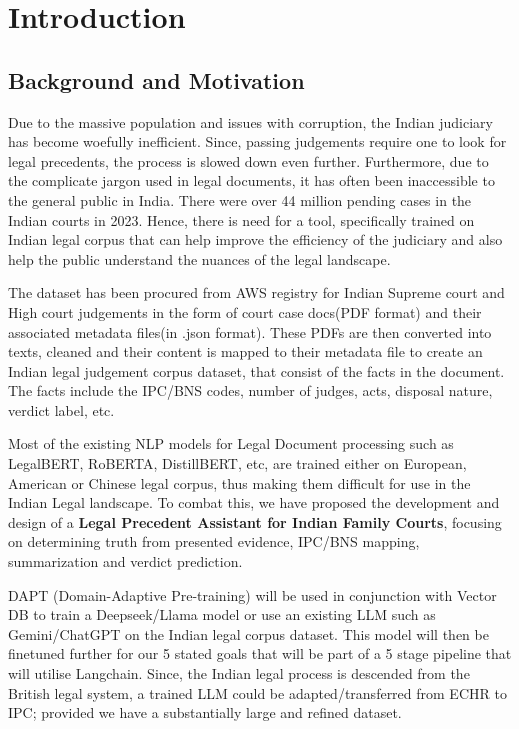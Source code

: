 \chapter{Introduction}{\label{ch:intro}}
\section{Background and Motivation}


Due to the massive population and issues with corruption, the Indian judiciary has become woefully inefficient. Since, passing judgements require one to look for legal precedents, the process is slowed down even further. Furthermore, due to the complicate jargon used in legal documents, it has often been inaccessible to the general public in India. There were over 44 million pending cases in the Indian courts in 2023\cite{b1}. Hence, there is need for a tool, specifically trained on Indian legal corpus that can help improve the efficiency of the judiciary and also help the public understand the nuances of the legal landscape. 

The dataset has been procured from AWS registry for Indian Supreme court and High court judgements in the form of court case docs(PDF format) and their associated metadata files(in .json format). These PDFs are then converted into texts, cleaned and their content is mapped to their metadata file to create an Indian legal judgement corpus dataset, that consist of the facts in the document. The facts include the IPC/BNS codes, number of judges, acts, disposal nature, verdict label, etc.

Most of the existing NLP models for Legal Document processing such as LegalBERT, RoBERTA, DistillBERT, etc, are trained either on European, American or Chinese legal corpus, thus making them difficult for use in the Indian Legal landscape. To combat this, we have proposed the development and design of a \textbf{Legal Precedent Assistant for Indian Family Courts}, focusing on determining truth from presented evidence, IPC/BNS mapping, summarization and verdict prediction.

DAPT (Domain-Adaptive Pre-training) will be used in conjunction with Vector DB to train a Deepseek/Llama model or use an existing LLM such as Gemini/ChatGPT on the Indian legal corpus dataset. This model will then be finetuned further for our 5 stated goals that will be part of a 5 stage pipeline that will utilise Langchain. Since, the Indian legal process is descended from the British legal system, a trained LLM could be adapted/transferred from ECHR to IPC; provided we have a substantially large and refined dataset.

